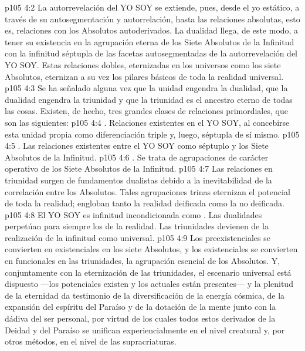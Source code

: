 \vs p105 4:2 La autorrevelación del YO SOY se extiende, pues, desde el yo estático, a través de su autosegmentación y autorrelación, hasta las relaciones absolutas, esto es, relaciones con los Absolutos autoderivados. La dualidad llega, de este modo, a tener su existencia en la agrupación eterna de los Siete Absolutos de la Infinitud con la infinitud séptupla de las facetas autosegmentadas de la autorrevelación del YO SOY. Estas relaciones dobles, eternizadas en los universos como los siete Absolutos, eternizan a su vez los pilares básicos de toda la realidad universal.
\vs p105 4:3 Se ha señalado alguna vez que la unidad engendra la dualidad, que la dualidad engendra la triunidad y que la triunidad es el ancestro eterno de todas las cosas. Existen, de hecho, tres grandes clases de relaciones primordiales, que son las siguientes:
\vs p105 4:4 . Relaciones existentes en el YO SOY, al concebirse esta unidad propia como diferenciación triple y, luego, séptupla de sí mismo.
\vs p105 4:5 . Las relaciones existentes entre el YO SOY como séptuplo y los Siete Absolutos de la Infinitud.
\vs p105 4:6 . Se trata de agrupaciones de carácter operativo de los Siete Absolutos de la Infinitud.
\vs p105 4:7 \pc Las relaciones en triunidad surgen de fundamentos dualistas debido a la inevitabilidad de la correlación entre los Absolutos. Tales agrupaciones trinas eternizan el potencial de toda la realidad; engloban tanto la realidad deificada como la no deificada.
\vs p105 4:8 El YO SOY es infinitud incondicionada como . Las dualidades perpetúan para siempre los  de la realidad. Las triunidades devienen de la realización de la infinitud como  universal.
\vs p105 4:9 Los preexistenciales se convierten en existenciales en los siete Absolutos, y los existenciales se convierten en funcionales en las triunidades, la agrupación esencial de los Absolutos. Y, conjuntamente con la eternización de las triunidades, el escenario universal está dispuesto ---los potenciales existen y los actuales están presentes--- y la plenitud de la eternidad da testimonio de la diversificación de la energía cósmica, de la expansión del espíritu del Paraíso y de la dotación de la mente junto con la dádiva del ser personal, por virtud de los cuales todos estos derivados de la Deidad y del Paraíso se unifican experiencialmente en el nivel creatural y, por otros métodos, en el nivel de las supracriaturas.
